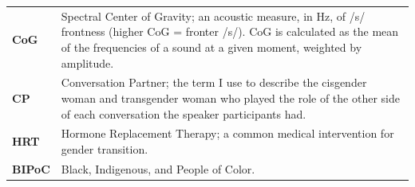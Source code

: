 \documentclass[12pt,twoside]{reedthesis}
\begin{document}
	\begin{table}[h]
	\centering %
	\begin{tabular}{lp{4in}}
		\textbf{CoG}  	&  Spectral Center of Gravity; an acoustic measure, in Hz, of /s/ frontness (higher CoG = fronter /s/). CoG is calculated as the mean of the frequencies of a sound at a given moment, weighted by amplitude. \\
		\textbf{CP} & Conversation Partner; the term I use to describe the cisgender woman and transgender woman who played the role of the other side of each conversation the speaker participants had. \\
		\textbf{HRT} & Hormone Replacement Therapy; a common medical intervention for gender transition. \\
		\textbf{BIPoC} & Black, Indigenous, and People of Color.
	\end{tabular}
	\end{table}
	

    \tableofcontents
    \listoftables
    \listoffigures

\end{document}
